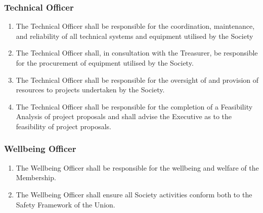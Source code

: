 \documentclass[parskip=half]{scrartcl}
\begin{document}
            \subsubsection{Technical Officer}
                \label{executive--executive-positions--technical-officer}
                \begin{enumerate}
                    \item The Technical Officer shall be responsible for the coordination, maintenance, and reliability of all technical systems and equipment utilised by the Society
                    
                    \item The Technical Officer shall, in consultation with the Treasurer, be responsible for the procurement of equipment utilised by the Society.
                    
                    \item The Technical Officer shall be responsible for the oversight of and provision of resources to projects undertaken by the Society.
                    
                    \item The Technical Officer shall be responsible for the completion of a Feasibility Analysis of project proposals and shall advise the Executive as to the feasibility of project proposals.
                \end{enumerate}
            
            \subsubsection{Wellbeing Officer}
                \label{executive--executive-positions--wellbeing-officer}
                \begin{enumerate}
                    \item The Wellbeing Officer shall be responsible for the wellbeing and welfare of the Membership.
                    
                    \item The Wellbeing Officer shall ensure all Society activities conform both to the Safety Framework of the Union.
                \end{enumerate}
            
\end{document}

